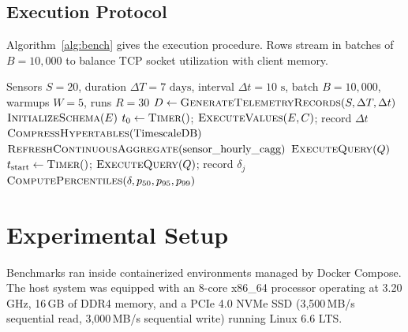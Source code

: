 \documentclass[conference,a4paper]{IEEEtran}
\begin{document}
\subsection{Execution Protocol}
Algorithm~\ref{alg:bench} gives the execution procedure. Rows stream in batches of $B = 10{,}000$ to balance TCP socket utilization with client memory.

\begin{algorithm}[t]
\caption{Benchmarking Pipeline Protocol}
\label{alg:bench}
\begin{algorithmic}[1]
\REQUIRE Sensors $S = 20$, duration $\Delta T = 7\text{ days}$, interval $\Delta t = 10\text{ s}$, batch $B = 10{,}000$, warmups $W = 5$, runs $R = 30$
\STATE $D \leftarrow \textsc{GenerateTelemetryRecords}(S, \Delta T, \Delta t)$ 
  \STATE $\textsc{InitializeSchema}(E)$
    \STATE $t_0 \leftarrow \textsc{Timer}()$;\; $\textsc{ExecuteValues}(E, C)$;\; record $\Delta t$
  \ENDFOR
\ENDFOR
\STATE $\textsc{CompressHypertables}(\text{TimescaleDB})$
\STATE $\textsc{RefreshContinuousAggregate}(\text{sensor\_hourly\_cagg})$
    \STATE $\textsc{ExecuteQuery}(Q)$ 
  \ENDFOR
    \STATE $t_{\mathrm{start}} \leftarrow \textsc{Timer}()$;\; $\textsc{ExecuteQuery}(Q)$;\; record $\delta_j$
  \ENDFOR
  \STATE $\textsc{ComputePercentiles}(\delta, p_{50}, p_{95}, p_{99})$
\ENDFOR
\end{algorithmic}
\end{algorithm}

\section{Experimental Setup}
Benchmarks ran inside containerized environments managed by Docker Compose. The host system was equipped with an 8-core x86\_64 processor operating at 3.20\,GHz, 16\,GB of DDR4 memory, and a PCIe 4.0 NVMe SSD (3,500\,MB/s sequential read, 3,000\,MB/s sequential write) running Linux 6.6 LTS.
\end{document}
